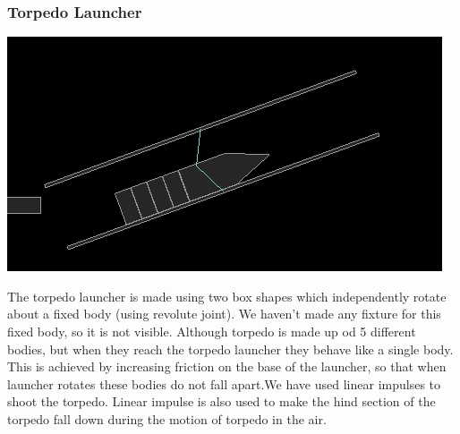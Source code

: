 \documentclass[11pt]{article}
\begin{document}
\subsubsection{Torpedo Launcher}
\begin{center}
 \includegraphics[scale=0.5]{./images/launcher}
 \end{center}
The torpedo launcher is made using two box shapes which independently rotate about a fixed body (using revolute joint). 
We haven't made any fixture for this fixed body, so it is not visible. Although torpedo is made up od 5 different bodies, but when they reach 
the torpedo launcher they behave like a single body. This is achieved by increasing friction on the base of the launcher, so that
when launcher rotates these bodies do not  fall apart.We have used linear impulses to shoot the torpedo. Linear impulse is also used to make the hind section of the torpedo fall down during
the motion of torpedo in the air.
\end{document}
